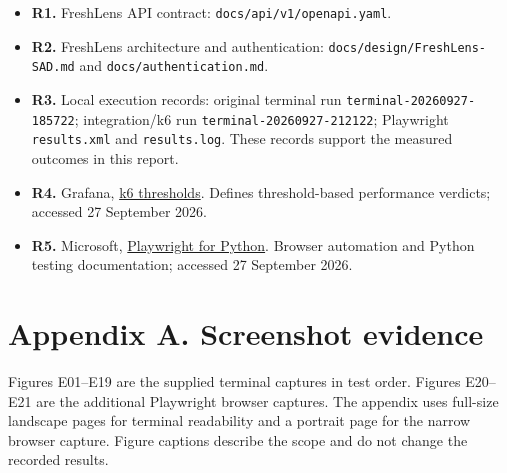 \documentclass[
  11pt,
]{article}
\providecommand{\tightlist}{%
  \setlength{\itemsep}{0pt}\setlength{\parskip}{0pt}}
\begin{document}
\begin{itemize}
\tightlist
\item
  \textbf{R1.} FreshLens API contract:
  \texttt{docs/api/v1/openapi.yaml}.
\item
  \textbf{R2.} FreshLens architecture and authentication:
  \texttt{docs/design/FreshLens-SAD.md} and
  \texttt{docs/authentication.md}.
\item
  \textbf{R3.} Local execution records: original terminal run
  \texttt{terminal-20260927-185722}; integration/k6 run
  \texttt{terminal-20260927-212122}; Playwright \texttt{results.xml} and
  \texttt{results.log}. These records support the measured outcomes in
  this report.
\item
  \textbf{R4.} Grafana,
  \href{https://grafana.com/docs/k6/latest/using-k6/thresholds/}{k6
  thresholds}. Defines threshold-based performance verdicts; accessed 27
  September 2026.
\item
  \textbf{R5.} Microsoft,
  \href{https://playwright.dev/python/docs/intro}{Playwright for
  Python}. Browser automation and Python testing documentation; accessed
  27 September 2026.
\end{itemize}

\section{Appendix A. Screenshot
evidence}\label{appendix-a.-screenshot-evidence}

Figures E01--E19 are the supplied terminal captures in test order.
Figures E20--E21 are the additional Playwright browser captures. The
appendix uses full-size landscape pages for terminal readability and a
portrait page for the narrow browser capture. Figure captions describe
the scope and do not change the recorded results.
\end{document}
